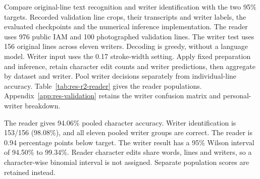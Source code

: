 Compare original-line text recognition and writer identification with the two 95\% targets.
Recorded validation line crops, their transcripts and writer labels, the evaluated checkpoints and the numerical inference implementation.
The reader uses 976 public IAM and 100 photographed validation lines. The writer test uses 156 original lines across eleven writers. Decoding is greedy, without a language model. Writer input uses the 0.17 stroke-width setting.
Apply fixed preparation and inference, retain character edit counts and writer predictions, then aggregate by dataset and writer. Pool writer decisions separately from individual-line accuracy.
Table~\ref{tab:res-r2-reader} gives the reader populations. Appendix~\ref{app:res-validation} retains the writer confusion matrix and personal-writer breakdown.

The reader gives 94.06\% pooled character accuracy. Writer identification is 153/156 (98.08\%), and all eleven pooled writer groups are correct. The reader is 0.94 percentage points below target.
The writer result has a 95\% Wilson interval of 94.50\% to 99.34\%. Reader character edits share words, lines and writers, so a character-wise binomial interval is not assigned. Separate population scores are retained instead.
\FloatBarrier

